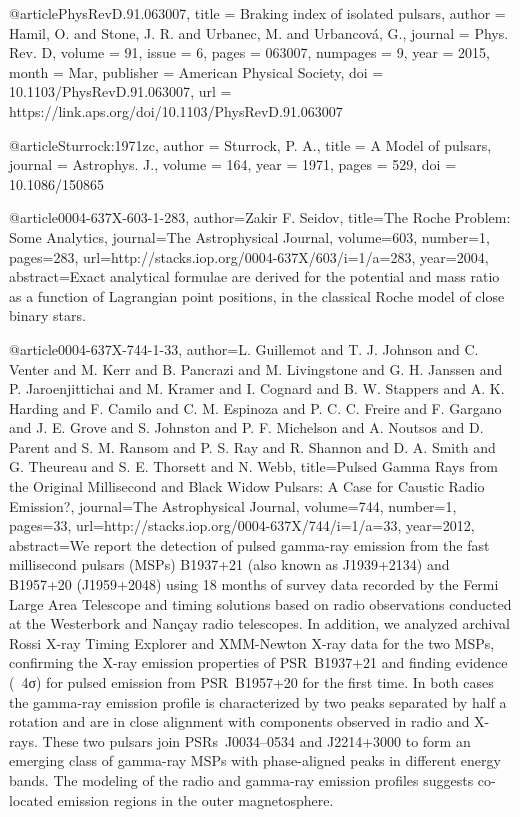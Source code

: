 {@article{PhysRevD.91.063007,
  title = {Braking index of isolated pulsars},
  author = {Hamil, O. and Stone, J. R. and Urbanec, M. and Urbancov\'a, G.},
  journal = {Phys. Rev. D},
  volume = {91},
  issue = {6},
  pages = {063007},
  numpages = {9},
  year = {2015},
  month = {Mar},
  publisher = {American Physical Society},
  doi = {10.1103/PhysRevD.91.063007},
  url = {https://link.aps.org/doi/10.1103/PhysRevD.91.063007}
}


@article{Sturrock:1971zc,
      author         = {Sturrock, P. A.},
      title          = {A Model of pulsars},
      journal        = {Astrophys. J.},
      volume         = {164},
      year           = {1971},
      pages          = {529},
      doi            = {10.1086/150865}
}

@article{0004-637X-603-1-283,
  author={Zakir F. Seidov},
  title={The Roche Problem: Some Analytics},
  journal={The Astrophysical Journal},
  volume={603},
  number={1},
  pages={283},
  url={http://stacks.iop.org/0004-637X/603/i=1/a=283},
  year={2004},
  abstract={Exact analytical formulae are derived for the potential and mass ratio as a function of Lagrangian point positions, in the classical Roche model of close binary stars.}
}


@article{0004-637X-744-1-33,
  author={L. Guillemot and T. J. Johnson and C. Venter and M. Kerr and B. Pancrazi and M. Livingstone and G. H. Janssen and P.
Jaroenjittichai and M. Kramer and I. Cognard and B. W. Stappers and A. K. Harding and F. Camilo and C. M. Espinoza and P. C. C.
Freire and F. Gargano and J. E. Grove and S. Johnston and P. F. Michelson and A. Noutsos and D. Parent and S. M. Ransom and P. S.
Ray and R. Shannon and D. A. Smith and G. Theureau and S. E. Thorsett and N. Webb},
  title={Pulsed Gamma Rays from the Original Millisecond and Black Widow Pulsars: A Case for Caustic Radio Emission?},
  journal={The Astrophysical Journal},
  volume={744},
  number={1},
  pages={33},
  url={http://stacks.iop.org/0004-637X/744/i=1/a=33},
  year={2012},
  abstract={We report the detection of pulsed gamma-ray emission from the fast millisecond pulsars (MSPs) B1937+21 (also known as J1939+2134) and B1957+20 (J1959+2048) using 18 months of survey data recorded by the Fermi Large Area Telescope and timing solutions based on radio observations conducted at the Westerbork and Nançay radio telescopes. In addition, we analyzed archival Rossi X-ray Timing Explorer and XMM-Newton X-ray data for the two MSPs, confirming the X-ray emission properties of PSR B1937+21 and finding evidence (~4σ) for pulsed emission from PSR B1957+20 for the first time. In both cases the gamma-ray emission profile is characterized by two peaks separated by half a rotation and are in close alignment with components observed in radio and X-rays. These two pulsars join PSRs J0034–0534 and J2214+3000 to form an emerging class of gamma-ray MSPs with phase-aligned peaks in different energy bands. The modeling of the radio and gamma-ray emission profiles suggests co-located emission regions in the outer magnetosphere.}
}

}
